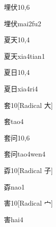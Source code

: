 \begin{entry}{埋伏}{10,6}
  \begin{phonetics}{埋伏}{mai2fu2}
  \end{phonetics}
\end{entry}

\begin{entry}{夏天}{10,4}
  \begin{phonetics}{夏天}{xia4tian1}
  \end{phonetics}
\end{entry}

\begin{entry}{夏日}{10,4}
  \begin{phonetics}{夏日}{xia4ri4}
  \end{phonetics}
\end{entry}

\begin{entry}{套}{10}[Radical 大]
  \begin{phonetics}{套}{tao4}
  \end{phonetics}
\end{entry}

\begin{entry}{套问}{10,6}
  \begin{phonetics}{套问}{tao4wen4}
  \end{phonetics}
\end{entry}

\begin{entry}{孬}{10}[Radical 子]
  \begin{phonetics}{孬}{nao1}
  \end{phonetics}
\end{entry}

\begin{entry}{害}{10}[Radical 宀]
  \begin{phonetics}{害}{hai4}
  \end{phonetics}
\end{entry}

